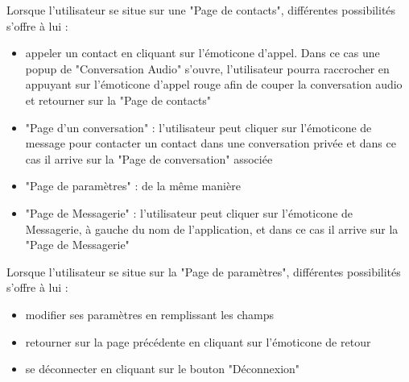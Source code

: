 	\newpage

	Lorsque l'utilisateur se situe sur une "Page de contacts", différentes possibilités s'offre à lui :
	\begin{itemize}
		\item appeler un contact en cliquant sur l'émoticone d'appel.
		Dans ce cas une popup de "Conversation Audio" s'ouvre, l'utilisateur pourra raccrocher en appuyant sur l'émoticone d'appel rouge afin de couper la conversation audio et retourner sur la "Page de contacts"
		\item "Page d'un conversation" : l'utilisateur peut cliquer sur l'émoticone de message pour contacter un contact dans une conversation privée et dans ce cas il arrive sur la "Page de conversation" associée
		\item "Page de paramètres" : de la même manière
		\item "Page de Messagerie" : l'utilisateur peut cliquer sur l'émoticone de Messagerie, à gauche du nom de l'application, et dans ce cas il arrive sur la "Page de Messagerie"\\
	\end{itemize}

	Lorsque l'utilisateur se situe sur la "Page de paramètres", différentes possibilités s'offre à lui :
	\begin{itemize}
		\item modifier ses paramètres en remplissant les champs
		\item retourner sur la page précédente en cliquant sur l'émoticone de retour
		\item se déconnecter en cliquant sur le bouton "Déconnexion"\\
	\end{itemize}

